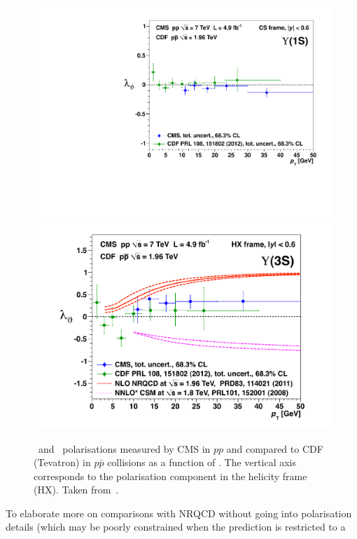 \begin{figure}[h]
\begin{center}
  \includegraphics[height=0.25\textheight]{Chapters/pQuarkonia/cmscdfupsipol1.pdf}
  \includegraphics[height=0.25\textheight]{Chapters/pQuarkonia/CMSCDFupsipol3.pdf}
  \caption{\PgUa~and \PgUc~polarisations measured by CMS in $pp$ and
    compared to CDF (Tevatron) in $p\bar{p}$ collisions as a function
    of \pt. The vertical axis corresponds to 
    the polarisation component in the helicity frame (HX). Taken from~\cite{CMSupsipol}.}
  \label{fig:upsipol}
\end{center}
\end{figure}
To elaborate more on comparisons with NRQCD without going into polarisation details
(which may be poorly constrained when the prediction is restricted to a
